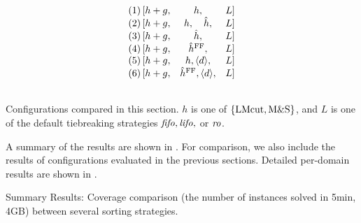 \begin{table}[htbp]
 \centering
 \[
 \begin{array}{lcll}
  (1)\, [h+g, & h,                           &L] \\\relax
  (2)\, [h+g, & h,     \quad   \hat{h},      &L] \\\relax
  (3)\, [h+g, & \hat{h},                     &L] \\\relax
  (4)\, [h+g, & \hat{h}^{\text{FF}},               &L] \\\relax
  (5)\, [h+g, & h, {\left<d\right>}, &L] \\\relax
  (6)\, [h+g, & \hat{h}^{\text{FF}}, {\left<d\right>}, &L] \\\relax
 \end{array}  
 \]
 \caption{Configurations compared in this section. $h$ is
 one of ${\left\{\text{LMcut}, \text{M\&S}\right\}}$, and $L$ is one of the default
 tiebreaking strategies ${\text{\textit{fifo}}},{\text{\textit{lifo}}},$ or ${\text{\textit{ro}}}$. }
 \label{list:distance-configs}
\end{table}


A summary of the results are shown in . For
comparison, we also include the results of configurations evaluated in the previous sections.
Detailed per-domain results are shown in
.

\begin{table}[htbp]
 \centering
 
 \caption{
 Summary Results: Coverage comparison (the number
 of instances solved in 5min, 4GB) between several sorting strategies.
 }
 \label{tbl:dtg-summary}
\end{table}


